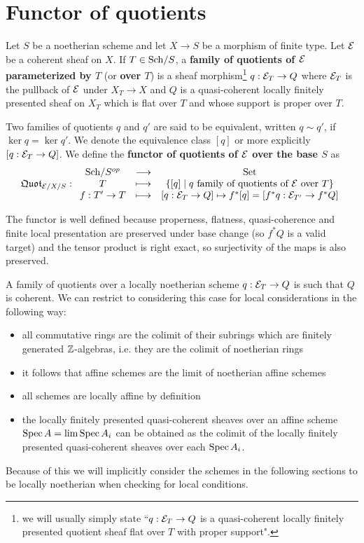 \section{Functor of quotients}
\begin{definition}
Let $S$ be a noetherian scheme and let $X\to S$ be a morphism of finite type. Let $\mathcal{E}$ be a coherent sheaf on $X$. If $T\in {\mathrm{Sch}}/{S}$, a \textbf{family of quotients of $\mathcal{E}$ parameterized by $T$} (or \textbf{over $T$}) is a sheaf morphism\footnote{we will usually simply state ``$q:\mathcal{E}_T\to Q$ is a quasi-coherent locally finitely presented quotient sheaf flat over $T$ with proper support".} $q:\mathcal{E}_T\to Q$ where $\mathcal{E}_T$ is the pullback of $\mathcal{E}$ under $X_T\to X$ and $Q$ is a quasi-coherent locally finitely presented sheaf on $X_T$ which is flat over $T$ and whose support is proper over $T$.

Two families of quotients $q$ and $q'$ are said to be equivalent, written $q\sim q'$, if $\ker q=\ker q'$. We denote the equivalence class $[q]$ or more explicitly $[q:\mathcal{E}_T\to Q]$. We define the \textbf{functor of quotients of $\mathcal{E}$ over the base $S$} as
\[\mathfrak{Quot}_{\mathcal{E}/X/S}:\begin{array}{ccc} {{\mathrm{Sch}}/{S}^{op}} & \longrightarrow & {\mathrm{Set}}\\ {T} & \longmapsto & {\left\{{[q]\mid q\text{ family of quotients of $\mathcal{E}$ over $T$}}\right\}}\\ {f:T'\to T} & \longmapsto & {[q:\mathcal{E}_T\to Q]\mapsto f^\ast[q]=[f^\ast q:\mathcal{E}_{T'}\to f^\ast Q]} \end{array}\]
\end{definition}

\begin{remark}
The functor is well defined because properness, flatness, quasi-coherence and finite local presentation are preserved under base change (so $f^\ast Q$ is a valid target) and the tensor product is right exact, so surjectivity of the maps is also preserved.
\end{remark}

\begin{remark}
A family of quotients over a locally noetherian scheme $q:\mathcal{E}_T\to Q$ is such that $Q$ is coherent. We can restrict to considering this case for local considerations in the following way:
\begin{itemize}
\item all commutative rings are the colimit of their subrings which are finitely generated $\mathbb{Z}$-algebras, i.e. they are the colimit of noetherian rings
\item it follows that affine schemes are the limit of noetherian affine schemes
\item all schemes are locally affine by definition
\item the locally finitely presented quasi-coherent sheaves over an affine scheme $\mathrm{Spec}\, A=\lim \mathrm{Spec}\, A_i$ can be obtained as the colimit of the locally finitely presented quasi-coherent sheaves over each $\mathrm{Spec}\, A_i$.
\end{itemize}
Because of this we will implicitly consider the schemes in the following sections to be locally noetherian when checking for local conditions.
\end{remark}


